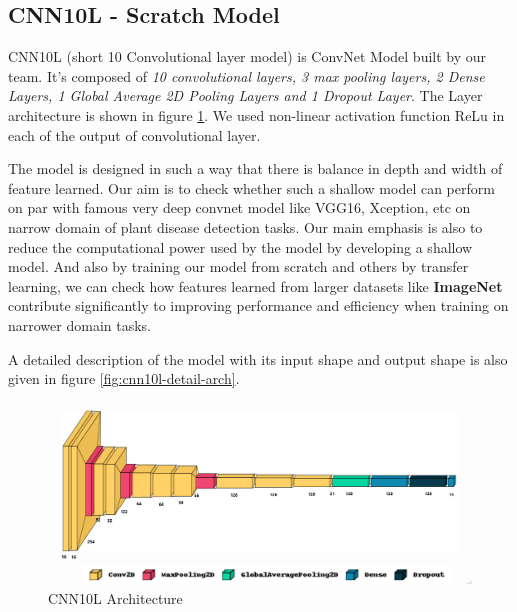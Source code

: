     \subsection{CNN10L - Scratch Model}
    CNN10L (short 10 Convolutional layer model) is ConvNet Model built by our team.
    It's composed of \textit{10 convolutional layers, 3 max pooling layers, 2 Dense Layers, 1 Global Average 2D Pooling Layers and 1 Dropout Layer}. The Layer architecture is shown in figure \ref{fig:CNN10L}. We used non-linear activation function ReLu in each of the output of convolutional layer. \par\vspace{1em}
    The model is designed in such a way that there is balance in depth and width of feature learned.
    Our aim is to check whether such a shallow model can perform on par with famous very deep convnet model like VGG16, Xception, etc on narrow domain of plant disease detection tasks. Our main emphasis is also to reduce the computational power used by the model by developing a shallow model. And also by training our model from scratch and others by transfer learning, we can check how features learned from larger datasets like \textbf{ImageNet} contribute significantly to improving performance and efficiency when training on narrower domain tasks.
    \par\vspace{1em}
    A detailed description of the model with its input shape and output shape is also given in figure \ref{fig:cnn10l-detail-arch}.\par\vspace{1em}

    \begin{figure}[h]
        \centering
            \includegraphics[width=\textwidth]{graphics/chapter3/CNN10L with label.png}
            \caption{CNN10L Architecture}
            \label{fig:CNN10L}
    \end{figure}

